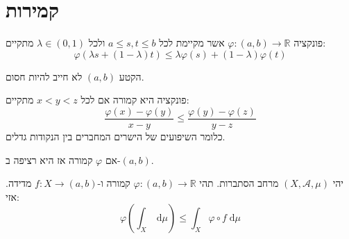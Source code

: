 \documentclass{tstextbook}
\begin{document}
\section{קמירות}

\begin{definition}
פונקציה \(\varphi:(a,b)\to \mathbb{R}\) אשר מקיימת לכל \(a\leq s,t \leq b\) ולכל \(\lambda \in (0,1)\) מתקיים:
$$\varphi\left( \lambda s+\left( 1-\lambda \right)t \right)\leq \lambda \varphi(s)+\left( 1-\lambda \right)\varphi(t)$$

\end{definition}
\begin{remark}
הקטע \((a,b)\) לא חייב להיות חסום.

\end{remark}
\begin{proposition}
פונקציה היא קמורה אם לכל \(x<y<z\) מתקיים:
$$\frac{\varphi(x)-\varphi(y)}{x-y}\leq \frac{\varphi(y)-\varphi(z)}{y-z}$$
כלומר השיפועים של הישרים המחברים בין הנקודות גדלים.

\end{proposition}
\begin{lemma}
אם \(\varphi\) קמורה אז היא רציפה ב-\((a,b)\).

\end{lemma}
\begin{theorem}
יהי \(\left( X,\mathcal{A},\mu \right)\) מרחב הסתברות. תהי \(\varphi:(a,b)\to \mathbb{R}\) קמורה ו-\(f:X\to (a,b)\) מדידה. אזי:
$$\varphi\left( \int _{X} \;\mathrm{d} \mu  \right)\leq \int _{X} \varphi \circ  f \;\mathrm{d} \mu $$

\end{theorem}
\end{document}
